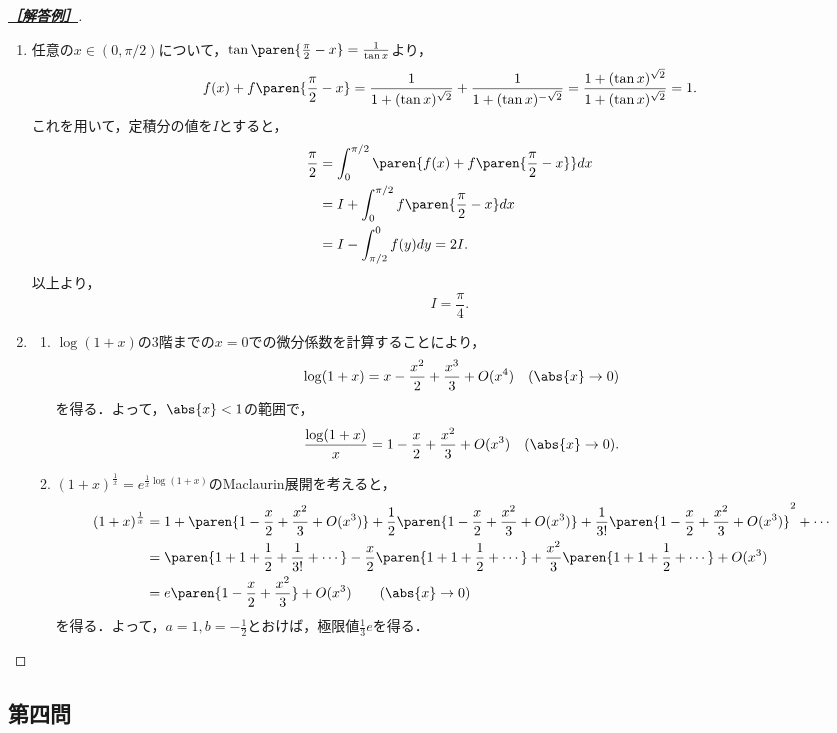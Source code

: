 \documentclass[uplatex,dvipdfmx]{jsarticle}
\begin{document}
\begin{proof}[\textbf{\underline{［解答例］}}]\mbox{}
    \begin{enumerate}[{問}1]
        \item 任意の$x\in(0,\pi/2)$について，$\tan\paren{\frac{\pi}{2}-x}=\frac{1}{\tan x}$より，
        \[f(x)+f\paren{\frac{\pi}{2}-x}=\frac{1}{1+(\tan x)^{\sqrt{2}}}+\frac{1}{1+(\tan x)^{-\sqrt{2}}}=\frac{1+(\tan x)^{\sqrt{2}}}{1+(\tan x)^{\sqrt{2}}}=1.\]
        これを用いて，定積分の値を$I$とすると，
        \begin{align*}
            \frac{\pi}{2}&=\int^{\pi/2}_0\paren{f(x)+f\paren{\frac{\pi}{2}-x}}dx\\
            &=I+\int^{\pi/2}_0f\paren{\frac{\pi}{2}-x}dx\\
            &=I-\int^0_{\pi/2}f(y)dy=2I.
        \end{align*}
        以上より，
        \[I=\frac{\pi}{4}.\]
        \item \begin{enumerate}
            \item $\log(1+x)$の3階までの$x=0$での微分係数を計算することにより，
            \[\log(1+x)=x-\frac{x^2}{2}+\frac{x^3}{3}+O(x^4)\quad(\abs{x}\to0)\]
            を得る．よって，$\abs{x}<1$の範囲で，
            \[\frac{\log(1+x)}{x}=1-\frac{x}{2}+\frac{x^2}{3}+O(x^3)\quad(\abs{x}\to0).\]
            \item $(1+x)^{\frac{1}{x}}=e^{\frac{1}{x}\log(1+x)}$のMaclaurin展開を考えると，
            \begin{align*}
                (1+x)^{\frac{1}{x}}&=1+\paren{1-\frac{x}{2}+\frac{x^2}{3}+O(x^3)}+\frac{1}{2}\paren{1-\frac{x}{2}+\frac{x^2}{3}+O(x^3)}+\frac{1}{3!}\paren{1-\frac{x}{2}+\frac{x^2}{3}+O(x^3)}^2+\cdots\\
                &=\paren{1+1+\frac{1}{2}+\frac{1}{3!}+\cdots}-\frac{x}{2}\paren{1+1+\frac{1}{2}+\cdots}+\frac{x^2}{3}\paren{1+1+\frac{1}{2}+\cdots}+O(x^3)\\
                &=e\paren{1-\frac{x}{2}+\frac{x^2}{3}}+O(x^3)\qquad(\abs{x}\to0)
            \end{align*}
            を得る．よって，$a=1,b=-\frac{1}{2}$とおけば，極限値$\frac{1}{3}e$を得る．
        \end{enumerate}
    \end{enumerate}
\end{proof}

\subsection{第四問}
\end{document}
